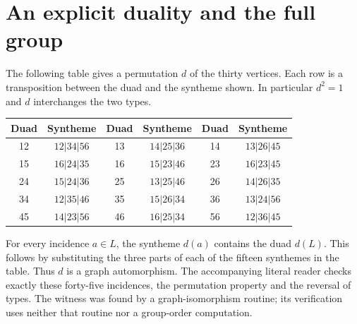 \documentclass[11pt]{article}
\begin{document}
\section{An explicit duality and the full group}
The following table gives a permutation $d$ of the thirty vertices.
Each row is a transposition between the duad and the syntheme shown.
In particular $d^2=1$ and $d$ interchanges the two types.
\begin{center}
\begin{tabular}{cc@{\qquad}cc@{\qquad}cc}
\toprule
Duad&Syntheme&Duad&Syntheme&Duad&Syntheme\\\midrule
12&$12|34|56$&13&$14|25|36$&14&$13|26|45$\\
15&$16|24|35$&16&$15|23|46$&23&$16|23|45$\\
24&$15|24|36$&25&$13|25|46$&26&$14|26|35$\\
34&$12|35|46$&35&$15|26|34$&36&$13|24|56$\\
45&$14|23|56$&46&$16|25|34$&56&$12|36|45$\\\bottomrule
\end{tabular}
\end{center}
For every incidence $a\in L$, the syntheme $d(a)$ contains the
duad $d(L)$. This follows by substituting the three parts of each of
the fifteen synthemes in the table. Thus $d$ is a graph automorphism.
The accompanying literal reader checks exactly these forty-five
incidences, the permutation property and the reversal of types.
The witness was found by a graph-isomorphism routine; its verification
uses neither that routine nor a group-order computation.
\end{document}
